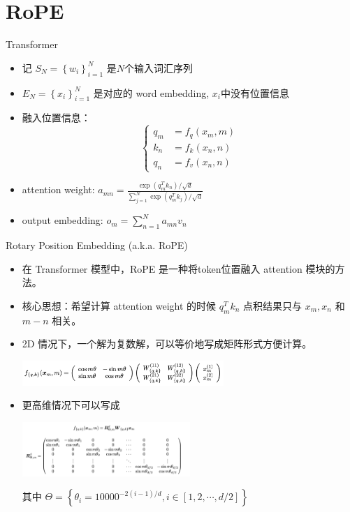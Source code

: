\section{RoPE}

\begin{frame}{Transformer}
    \begin{itemize}
        \item 记 $S_N = \left\{ w_i \right\}_{i=1}^{N} $ 是$N$个输入词汇序列
        \item $E_N=\left\{ x_i \right\}_{i=1}^{N}$ 是对应的 word embedding, $x_i$中没有位置信息
        \item 融入位置信息：
        \[
            \begin{cases} q_m &= f_q(x_m, m) \\ k_n &= f_k(x_n, n) \\ q_n &= f_v(x_n, n) \end{cases}
        \]
        \item attention weight: $a_{mn} = \frac{\exp(q_m^{T}k_n) / \sqrt d}{ \sum_{j=1}^{N}\exp(q_m^{T}k_j) / \sqrt d}$
        \item output embedding: $o_m = \sum_{n=1}^{N} a_{mn} v_n$
    \end{itemize}
\end{frame}

\begin{frame}{Rotary Position Embedding (a.k.a. RoPE)}
    \begin{itemize}
        \item 在 Transformer 模型中，RoPE 是一种将token位置融入 attention 模块的方法。
        \item 核心思想：希望计算 attention weight 的时候 $q_m^{T} k_n$ 点积结果只与 $x_m, x_n$ 和 $m-n$ 相关。
        \item 2D 情况下，一个解为复数解，可以等价地写成矩阵形式方便计算。
        \begin{center}
            \includegraphics[width=0.6\textwidth]{assets/rope2.png}
        \end{center}
        \item 更高维情况下可以写成
        \begin{center}
            \includegraphics[width=0.5\textwidth]{assets/roped.png}
        \end{center}
        其中 $\Theta = \left\{ \theta_i = 10000^{-2(i-1)/d}, i \in [1, 2, \cdots, d / 2] \right\} $
    \end{itemize}
\end{frame}
